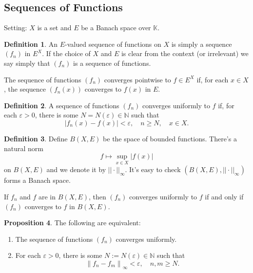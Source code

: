\documentclass[12pt,a4paper]{book}
\newcommand{\bb}[1]{\mathbb{#1}}
\newenvironment{enu}{\begin{enumerate}[(1)]}{\end{enumerate}}
\theoremstyle{definition}
\newtheorem{defn}{Definition}[section]
\newtheorem{prop}[defn]{Proposition}
\begin{document}
\subsection{Sequences of Functions}
Setting: $X$ is a set and $E$ be a Banach space over $\bb{K}$. 
\begin{defn}
    An $E$-valued sequence of functions on $X$ is simply a sequence $\left(f_n\right)$ in $E^X$. If the choice of $X$ and $E$ is clear from the context (or irrelevant) we say simply that $\left(f_n\right)$ is a sequence of functions.

    The sequence of functions $\left(f_n\right)$ converges pointwise to $f \in E^X$ if, for each $x \in X$, the sequence $\left(f_n(x)\right)$ converges to $f(x)$ in $E$. 
\end{defn}
\begin{defn}
    A sequence of functions $\left(f_n\right)$ converges uniformly to $f$ if, for each $\varepsilon>0$, there is some $N=N(\varepsilon) \in \mathbb{N}$ such that
    $$
    \left|f_n(x)-f(x)\right|<\varepsilon, \quad n \geq N, \quad x \in X .
    $$
\end{defn}
\begin{defn} 
    Define $B(X,E)$ be the space of bounded functions. There's a natural norm
    $$
                 f\mapsto \sup_{x\in X} |f(x)|
    $$
    on $B(X,E)$ and we denote it by $||\cdot||_{\infty}$. It's easy to check $(B(X,E),||\cdot||_{\infty})$ forms a Banach space. 

    If $f_n$ and $f$ are in $B(X, E)$, then $\left(f_n\right)$ converges uniformly to $f$ if and only if $\left(f_n\right)$ converges to $f$ in $B(X, E)$.

\end{defn}
    \begin{prop}
    The following are equivalent:
\begin{enu} 
    \item The sequence of functions $\left(f_n\right)$ converges uniformly.
    \item For each $\varepsilon>0$, there is some $N:=N(\varepsilon) \in \mathbb{N}$ such that
    $$
    \left\|f_n-f_m\right\|_{\infty}<\varepsilon, \quad n, m \geq N .
    $$
\end{enu}   
\end{prop}
\end{document}
